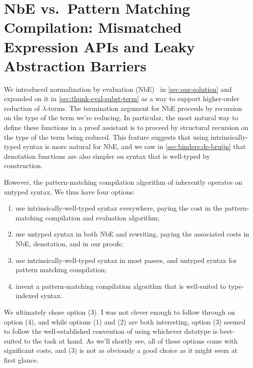 \section{NbE vs.\ Pattern Matching Compilation: Mismatched Expression APIs and Leaky Abstraction Barriers}\label{sec:rewriting-more:AST:choices}
We introduced normalization by evaluation (NbE)~\cite{NbE} in \autoref{sec:our-solution} and expanded on it in \autoref{sec:thunk-eval-subst-term} as a way to support higher-order reduction of $\lambda$-terms.
The termination argument for NbE proceeds by recursion on the type of the term we're reducing.
In particular, the most natural way to define these functions in a proof assistant is to proceed by structural recursion on the type of the term being reduced.
This feature suggests that using intrinsically-typed syntax is more natural for NbE, and we saw in \autoref{sec:binders:de-bruijn} that denotation functions are also simpler on syntax that is well-typed by construction.

However, the pattern-matching compilation algorithm of \textcite{maranget2008compiling} inherently operates on untyped syntax.
We thus have four options:
\begin{enumerate}[(1)]
\item
  use intrinsically-well-typed syntax everywhere, paying the cost in the pattern-matching compilation and evaluation algorithm;
\item
  use untyped syntax in both NbE and rewriting, paying the associated costs in NbE, denotation, and in our proofs;
\item
  use intrinsically-well-typed syntax in most passes, and untyped syntax for pattern matching compilation;
\item
  invent a pattern-matching compilation algorithm that is well-suited to type-indexed syntax.
\end{enumerate}
We ultimately chose option (3).
I was not clever enough to follow through on option (4), and while options (1) and (2) are both interesting, option (3) seemed to follow the well-established convention of using whichever datatype is best-suited to the task at hand.
As we'll shortly see, all of these options come with significant costs, and (3) is not as obviously a good choice as it might seem at first glance.

